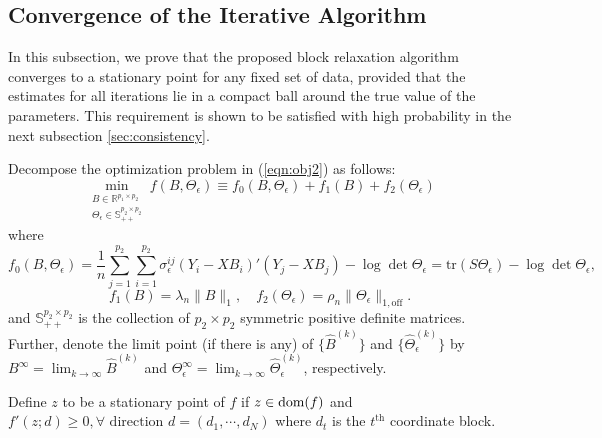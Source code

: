 %
%


\subsection{\normalsize Convergence of the Iterative Algorithm}\label{sec:convergence}

In this subsection, we prove that the proposed block relaxation algorithm converges to a stationary point for any fixed set of data, provided that the estimates for all iterations lie in a compact ball around the true value of the parameters. This requirement is shown to be satisfied with high probability in the next subsection \ref{sec:consistency}.

Decompose the optimization problem in (\ref{eqn:obj2}) as follows:
\begin{equation*}
\min\limits_{\substack{B\in\mathbb{R}^{p_1\times p_2}\\ \Theta_\epsilon\in\mathbb{S}_{++}^{p_2\times p_2}}}f(B,\Theta_\epsilon) \equiv f_0(B,\Theta_\epsilon) + f_1(B) + f_2(\Theta_\epsilon) 
\end{equation*}
where 
\begin{equation*}
f_0(B,\Theta_\epsilon) =\frac{1}{n}\sum_{j=1}^{p_2}\sum_{i=1}^{p_2}\sigma^{ij}_\epsilon (Y_i-XB_i)'(Y_j - XB_j)-\log \det \Theta_\epsilon = \text{tr}(S\Theta_\epsilon) - \log \det \Theta_\epsilon, 
\end{equation*}
\begin{equation*}
f_1(B) = \lambda_n\|B\|_1, \quad f_2(\Theta_\epsilon) = \rho_n\|\Theta_\epsilon\|_{1,\text{off}}.
\end{equation*}
and $\mathbb{S}_{++}^{p_2\times p_2}$ is the collection of $p_2\times p_2$ symmetric positive definite matrices. Further, denote the limit point (if there is any) of $\{\widehat{B}^{(k)}\}$ and $\{\widehat{\Theta}_\epsilon^{(k)}\}$ by 
$B^\infty = \lim_{k\rightarrow\infty} \widehat{B}^{(k)}$ and $\Theta^\infty_\epsilon =  \lim_{k\rightarrow\infty} \widehat{\Theta}_\epsilon^{(k)}$, respectively. 

\begin{definition} Define $z$ to be a stationary point of $f$ if $z\in \mbox{dom} (f)$ and $f'(z;d)\geq 0,\forall \text{ direction }d=(d_1,\cdots,d_N)$ where $d_t$ is the $t^{\text{th}}$ coordinate block. 
\end{definition}

